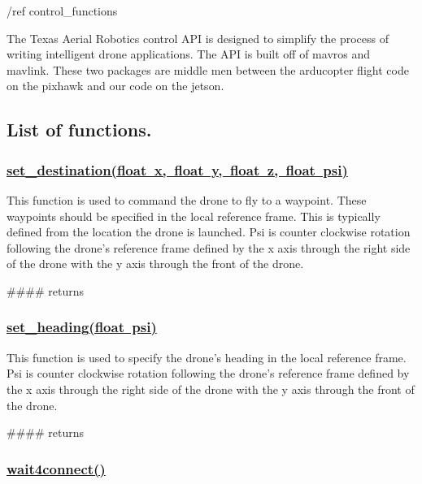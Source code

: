 /ref control\+\_\+functions

The Texas Aerial Robotics control A\+PI is designed to simplify the process of writing intelligent drone applications. The A\+PI is built off of mavros and mavlink. These two packages are middle men between the arducopter flight code on the pixhawk and our code on the jetson.

\subsection*{List of functions.}

\subsubsection*{\mbox{\hyperlink{group__control__functions_gab90a45d8b081ba329b9d0f886adbc2d5}{set\+\_\+destination(float x, float y, float z, float psi)}}}

This function is used to command the drone to fly to a waypoint. These waypoints should be specified in the local reference frame. This is typically defined from the location the drone is launched. Psi is counter clockwise rotation following the drone’s reference frame defined by the x axis through the right side of the drone with the y axis through the front of the drone.

\#\#\#\# returns 
\begin{DoxyCode}{0}
\end{DoxyCode}
 \subsubsection*{\mbox{\hyperlink{group__control__functions_ga92292bc0da7dd2a58edf8e9aa10eb682}{set\+\_\+heading(float psi)}}}

This function is used to specify the drone’s heading in the local reference frame. Psi is counter clockwise rotation following the drone’s reference frame defined by the x axis through the right side of the drone with the y axis through the front of the drone.

\#\#\#\# returns 
\begin{DoxyCode}{0}
\end{DoxyCode}
 \subsubsection*{\mbox{\hyperlink{group__control__functions_ga1921a30d419eb397f7e40875217b45d1}{wait4connect()}}}

